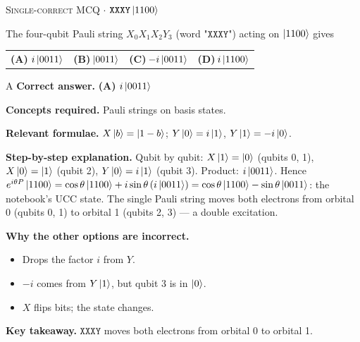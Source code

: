 \documentclass[11pt,a4paper]{article}
\newcommand{\optlabel}[1]{\textbf{(#1)}}
\newcommand{\correctlabel}[1]{\textcolor{okgreen}{\textbf{(#1)}\,\ding{51}}}
\newenvironment{qitem}[1]{\begin{list}{}{\setlength{\leftmargin}{3.3em}\setlength{\labelwidth}{3.1em}%
  \setlength{\labelsep}{0.2em}\setlength{\topsep}{3pt}\setlength{\parsep}{3pt}}\item[\textbf{Q.#1}\hfill]}{\end{list}}
\newcommand{\qsep}{\par\vspace{2pt}{\color{black!15}\hrule}\vspace{4pt}}
\newcommand{\qmeta}[2]{{\footnotesize\color{black!60}\textsc{#1} \;$\cdot$\; #2}\par}
\begin{document}
\begin{qitem}{31}
\qmeta{Single-correct MCQ}{$\texttt{XXXY}\ket{1100}$}
The four-qubit Pauli string $X_0X_1X_2Y_3$ (word $\texttt{"XXXY"}$) acting on $\ket{1100}$ gives
\par\smallskip\noindent\begin{tabularx}{\linewidth}{@{}*{4}{L}@{}}
\correctlabel{A}\,$i\ket{0011}$ & \optlabel{B}\,$\ket{0011}$ & \optlabel{C}\,$-i\ket{0011}$ & \optlabel{D}\,$i\ket{1100}$
\end{tabularx}
\end{qitem}
\begin{solbox}{A}
\textbf{\color{brand}Correct answer.} \textcolor{okgreen}{\textbf{(A)}} $i\ket{0011}$

\textbf{\color{brand}Concepts required.} Pauli strings on basis states.

\textbf{\color{brand}Relevant formulae.} $X\ket b = \ket{1-b}$; $Y\ket0 = i\ket1$, $Y\ket1 = -i\ket0$.

\textbf{\color{brand}Step-by-step explanation.} Qubit by qubit: $X\ket1 = \ket0$ (qubits 0, 1), $X\ket0 = \ket1$ (qubit 2), $Y\ket0 = i\ket1$ (qubit 3). Product: $i\ket{0011}$.
Hence $e^{i\theta P}\ket{1100} = \cos\theta\ket{1100} + i\sin\theta\,(i\ket{0011}) = \cos\theta\ket{1100} - \sin\theta\ket{0011}$: the notebook's
UCC state. The single Pauli string moves both electrons from orbital 0 (qubits 0, 1) to orbital 1 (qubits 2, 3) --- a double excitation.

\textbf{\color{brand}Why the other options are incorrect.}
\begin{itemize}[leftmargin=2.4em, itemsep=1pt, topsep=2pt]
\item[\textbf{(B)}] Drops the factor $i$ from $Y$.
\item[\textbf{(C)}] $-i$ comes from $Y\ket1$, but qubit 3 is in $\ket0$.
\item[\textbf{(D)}] $X$ flips bits; the state changes.
\end{itemize}
\textbf{\color{brand}Key takeaway.} $\texttt{XXXY}$ moves both electrons from orbital 0 to orbital 1.
\end{solbox}
\qsep
\end{document}
